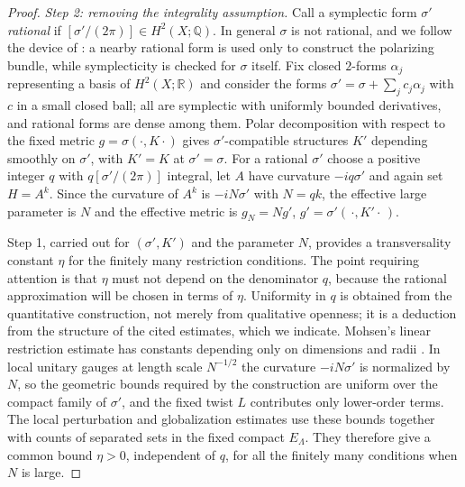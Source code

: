 \documentclass[12pt]{article}
\theoremstyle{remark}
\newcommand{\R}{\mathbb R}
\begin{document}
\begin{proof}
\emph{Step 2: removing the integrality assumption.} Call a symplectic
form $\sigma'$ \emph{rational} if $[\sigma'/(2\pi)]\in H^2(X;\mathbb Q)$.
In general $\sigma$ is not rational, and we follow the
device of \cite[Section 1]{Auroux2001b}: a nearby rational form is used
only to construct the polarizing bundle, while symplecticity is checked
for $\sigma$ itself. Fix closed $2$-forms $\alpha_j$ representing a
basis of $H^2(X;\R)$ and consider the forms
$\sigma'=\sigma+\sum_jc_j\alpha_j$ with $c$ in a small closed ball; all
are symplectic with uniformly bounded derivatives, and rational forms
are dense among them. Polar decomposition with respect to the fixed
metric $g=\sigma(\cdot,K\cdot)$ gives
$\sigma'$-compatible structures $K'$ depending smoothly on $\sigma'$,
with $K'=K$ at $\sigma'=\sigma$. For a rational $\sigma'$ choose a
positive integer $q$ with $q[\sigma'/(2\pi)]$ integral, let $A$ have
curvature $-iq\sigma'$ and again set $H=A^k$. Since the curvature of
$A^k$ is $-iN\sigma'$ with $N=qk$, the effective large parameter is
$N$ and the effective metric is $g_N=Ng'$, $g'=\sigma'(\,\cdot,K'\cdot\,)$.

Step 1, carried out for $(\sigma',K')$ and the parameter $N$, provides
a transversality constant $\eta$ for the finitely many restriction
conditions. The point requiring attention is that $\eta$ must not
depend on the denominator $q$, because the rational approximation will
be chosen in terms of $\eta$. Uniformity in $q$ is obtained from the
quantitative construction, not merely from qualitative openness; it is
a deduction from the structure of the cited estimates, which we
indicate. Mohsen's linear restriction estimate has constants depending
only on dimensions and radii
\cite[Theorem 6.5 and Corollary 6.6]{Mohsen2019}. In local unitary
gauges at length scale $N^{-1/2}$ the curvature $-iN\sigma'$ is
normalized by $N$, so the geometric bounds required by the construction
are uniform over the compact family of $\sigma'$, and the fixed twist
$L$ contributes only lower-order terms. The local perturbation and
globalization estimates
\cite[Proposition 8.2 and Sections 8.3--8.6]{Mohsen2019} use these
bounds together with counts of separated sets in the fixed compact
$E_\Lambda$. They therefore give a common bound $\eta>0$, independent
of $q$, for all the finitely many conditions when $N$ is large.


\end{proof}
\end{document}

